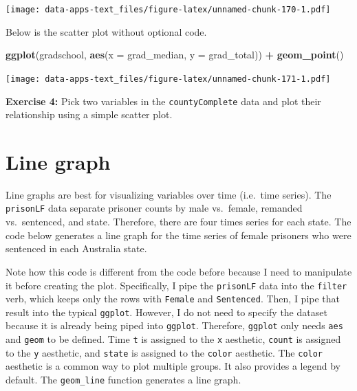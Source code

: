 \documentclass[
]{book}
\newenvironment{Shaded}{\begin{snugshade}}{\end{snugshade}}
\newcommand{\DataTypeTok}[1]{\textcolor[rgb]{0.13,0.29,0.53}{#1}}
\newcommand{\KeywordTok}[1]{\textcolor[rgb]{0.13,0.29,0.53}{\textbf{#1}}}
\newcommand{\NormalTok}[1]{#1}
\newcommand{\OperatorTok}[1]{\textcolor[rgb]{0.81,0.36,0.00}{\textbf{#1}}}
\newcommand{\StringTok}[1]{\textcolor[rgb]{0.31,0.60,0.02}{#1}}
\newenvironment{learncheck}%
{%
  \par\vspace{\baselineskip}\noindent 
  \color{Exercise}\begin{itshape}%
  \par\vspace{\baselineskip}\noindent\ignorespaces 
}%
{%
  \end{itshape}\ignorespacesafterend 
}
\begin{document}
\texttt{[image: data-apps-text\_files/figure-latex/unnamed-chunk-170-1.pdf]}

Below is the scatter plot without optional code.

\begin{Shaded}
\begin{Highlighting}[]
\KeywordTok{ggplot}\NormalTok{(gradschool, }\KeywordTok{aes}\NormalTok{(}\DataTypeTok{x =}\NormalTok{ grad_median, }\DataTypeTok{y =}\NormalTok{ grad_total)) }\OperatorTok{+}
\StringTok{  }\KeywordTok{geom_point}\NormalTok{()}
\end{Highlighting}
\end{Shaded}

\texttt{[image: data-apps-text\_files/figure-latex/unnamed-chunk-171-1.pdf]}

\begin{learncheck}
\textbf{Exercise 4:} Pick two variables in the \texttt{countyComplete}
data and plot their relationship using a simple scatter plot.
\end{learncheck}

\hypertarget{line-graph}{%
\section{Line graph}\label{line-graph}}

Line graphs are best for visualizing variables over time (i.e.~time series). The \texttt{prisonLF} data separate prisoner counts by male vs.~female, remanded vs.~sentenced, and state. Therefore, there are four times series for each state. The code below generates a line graph for the time series of female prisoners who were sentenced in each Australia state.

Note how this code is different from the code before because I need to manipulate it before creating the plot. Specifically, I pipe the \texttt{prisonLF} data into the \texttt{filter} verb, which keeps only the rows with \texttt{Female} and \texttt{Sentenced}. Then, I pipe that result into the typical \texttt{ggplot}. However, I do not need to specify the dataset because it is already being piped into \texttt{ggplot}. Therefore, \texttt{ggplot} only needs \texttt{aes} and \texttt{geom} to be defined. Time \texttt{t} is assigned to the \texttt{x} aesthetic, \texttt{count} is assigned to the \texttt{y} aesthetic, and \texttt{state} is assigned to the \texttt{color} aesthetic. The \texttt{color} aesthetic is a common way to plot multiple groups. It also provides a legend by default. The \texttt{geom\_line} function generates a line graph.
\end{document}
